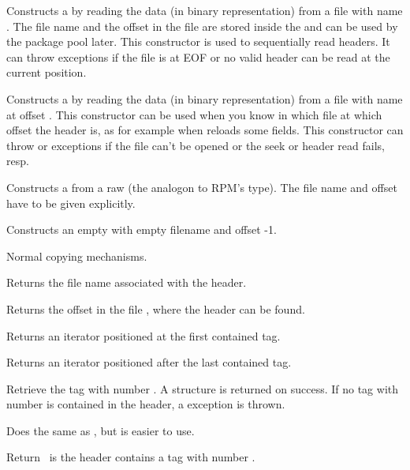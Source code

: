 \documentclass[10pt]{article}
\begin{document}
Constructs a  by reading the data (in binary
representation) from a file  with name . The file name
and the offset in the file are stored inside the  and
can be used by the package pool later. This constructor is used to
sequentially read headers. It can throw \excp{} exceptions if the file
is at EOF or no valid header can be read at the current position.

Constructs a  by reading the data (in binary
representation) from a file with name  at offset .
This constructor can be used when you know in which file at which
offset the header is, as for example when  reloads some
fields. This constructor can throw  or \excp{} exceptions
if the file can't be opened or the seek or header read fails, resp.

Constructs a  from a raw  (the
analogon to RPM's  type). The file name and offset have
to be given explicitly.

Constructs an empty  with empty filename and offset -1.

Normal copying mechanisms.

Returns the file name associated with the header.

Returns the offset in the file , where the header can
be found.

Returns an iterator positioned at the first contained tag.

Returns an iterator positioned after the last contained tag.

Retrieve the tag with number . A  structure is
returned on success. If no tag with number  is contained in
the header, a  exception is thrown.

Does the same as , but is easier to use.

Return \true\ is the header contains a tag with number .
\end{document}
